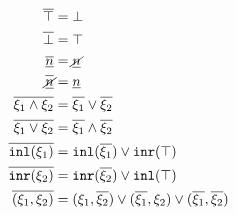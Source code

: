 \begin{subequations}\label{defn:dual}
\begin{align}
  \cdual{\ctruth} &= \cfalsity \\
  \cdual{\cfalsity} &= \ctruth \\
  \cdual{\cnum{n}} &= \cnotnum{n} \\
  \cdual{\cnotnum{n}} &= \cnum{n} \\
  \cdual{\cand{\xi_1}{\xi_2}} &= \cor{\cdual{\xi_1}}{\cdual{\xi_2}} \\
  \cdual{\cor{\xi_1}{\xi_2}} &= \cand{\cdual{\xi_1}}{\cdual{\xi_2}} \\
  \cdual{\cinl{\xi_1}} &= \cor{ \cinl{\cdual{\xi_1}} }{ \cinr{\ctruth} } \\
  \cdual{\cinr{\xi_2}} &= \cor{ \cinr{\cdual{\xi_2}} }{ \cinl{\ctruth} } \\
  \cdual{\cpair{\xi_1}{\xi_2}} &=
  \cor{ \cor{ 
    \cpair{\xi_1}{\cdual{\xi_2}}
  }{
    \cpair{\cdual{\xi_1}}{\xi_2}
  }}{
    \cpair{\cdual{\xi_1}}{\cdual{\xi_2}}
  }
\end{align}
\end{subequations}

